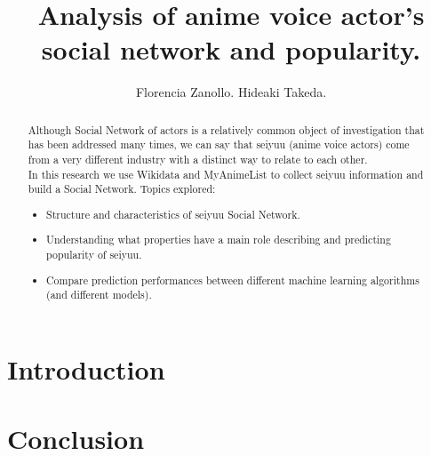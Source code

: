 \documentclass[a4paper]{report}
\begin{document}
	\title{Analysis of anime voice actor's social network and popularity.}
	\author{Florencia Zanollo. Hideaki Takeda.}
	\maketitle
	\tableofcontents

\begin{abstract}
	Although Social Network of actors is a relatively common object of investigation that has been addressed many times, we can say that seiyuu (anime voice actors) come from a very different industry with a distinct way to relate to each other. \\
	In this research we use Wikidata and MyAnimeList to collect seiyuu information and build a Social Network. Topics explored:
	\begin{itemize}
	\item Structure and characteristics of seiyuu Social Network.
	\item Understanding what properties have a main role describing and predicting popularity of seiyuu.
	\item Compare prediction performances between different machine learning algorithms (and different models).
	\end{itemize}
\end{abstract}

\chapter*{Introduction}






\chapter*{Conclusion}

	

\begin{thebibliography}{5}

\end{thebibliography}
\end{document}
